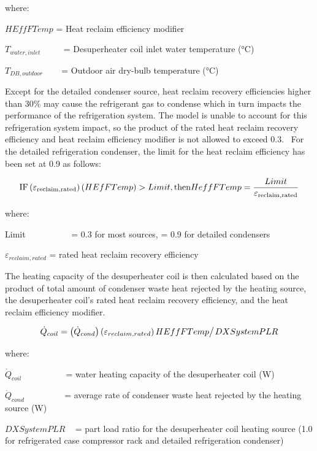 where:

\(HEffFTemp\) = Heat reclaim efficiency modifier

\({T_{water,inlet}}\) ~~~~ = Desuperheater coil inlet water temperature (°C)

\({T_{DB,outdoor}}\) ~~~ = Outdoor air dry-bulb temperature (°C)

Except for the detailed condenser source, heat reclaim recovery efficiencies higher than 30\% may cause the refrigerant gas to condense which in turn impacts the performance of the refrigeration system. The model is unable to account for this refrigeration system impact, so the product of the rated heat reclaim recovery efficiency and heat reclaim efficiency modifier is not allowed to exceed 0.3.~ For the detailed refrigeration condenser, the limit for the heat reclaim efficiency has been set at 0.9 as follows:

\begin{equation}
{\rm{IF}}\left( {{\varepsilon_{{\rm{reclaim,rated}}}}} \right)\left( {HEfFTemp} \right) > Limit,{\rm{ then }}HeffFTemp = \frac{{Limit}}{{{\varepsilon_{{\rm{reclaim,rated}}}}}}
\end{equation}

where:

Limit~~~~~~~~~~ = 0.3 for most sources, = 0.9 for detailed condensers

\({\varepsilon_{reclaim,rated}}\) = rated heat reclaim recovery efficiency

The heating capacity of the desuperheater coil is then calculated based on the product of total amount of condenser waste heat rejected by the heating source, the desuperheater coil's rated heat reclaim recovery efficiency, and the heat reclaim efficiency modifier.

\begin{equation}
{\dot Q_{coil}} = {{\left( {{{\dot Q}_{cond}}} \right)\left( {{\varepsilon_{reclaim,rated}}} \right)HEffFTemp} \mathord{\left/ {\vphantom {{\left( {{{\dot Q}_{cond}}} \right)\left( {{\varepsilon_{reclaim,rated}}} \right)HEffFTemp} {DXSystemPLR}}} \right. } {DXSystemPLR}}
\end{equation}

where:

\({\dot Q_{coil}}\) ~~~~~~~~~ = water heating capacity of the desuperheater coil (W)

\({\dot Q_{cond}}\) ~~~~~~~~ = average rate of condenser waste heat rejected by the heating source (W)

\(DXSystemPLR\) ~ = part load ratio for the desuperheater coil heating source (1.0 for refrigerated case compressor rack and detailed refrigeration condenser)


